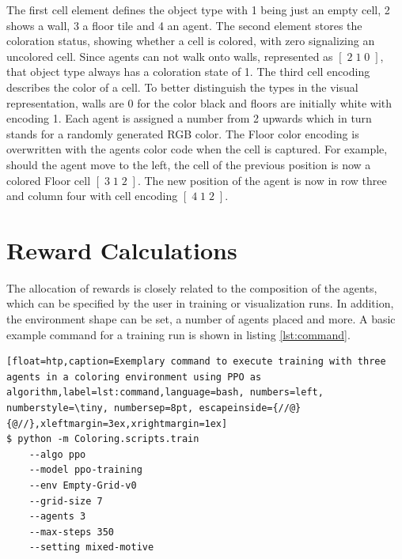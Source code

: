 
The first cell element defines the object type with 1 being just an empty cell, 2 shows a wall, 3 a floor tile and 4 an agent. The second element stores the coloration status, showing whether a cell is colored, with zero signalizing an uncolored cell. Since agents can not walk onto walls, represented as $[\;2\;1\;0\;]$, that object type always has a coloration state of 1. The third cell encoding describes the color of a cell. To better distinguish the types in the visual representation, walls are 0 for the color black and floors are initially white with encoding 1. Each agent is assigned a number from 2 upwards which in turn stands for a randomly generated RGB color. The Floor color encoding is overwritten with the agents color code when the cell is captured. For example, should the agent move to the left, the cell of the previous position is now a colored Floor cell $[\;3\;1\;2\;]$. The new position of the agent is now in row three and column four with cell encoding $[\;4\;1\;2\;]$.

\section{Reward Calculations}\label{reward_calculations}
The allocation of rewards is closely related to the composition of the agents, which can be specified by the user in training or visualization runs. In addition, the environment shape can be set, a number of agents placed and more. A basic example command for a training run is shown in listing \ref{lst:command}.

\begin{lstlisting}[float=htp,caption=Exemplary command to execute training with three agents in a coloring environment using PPO as algorithm,label=lst:command,language=bash, numbers=left, numberstyle=\tiny, numbersep=8pt, escapeinside={//@}{@//},xleftmargin=3ex,xrightmargin=1ex]
$ python -m Coloring.scripts.train
    --algo ppo
    --model ppo-training
    --env Empty-Grid-v0 
    --grid-size 7
    --agents 3 
    --max-steps 350
    --setting mixed-motive
\end{lstlisting}

